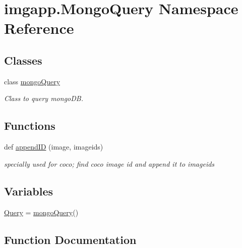 \hypertarget{namespaceimgapp_1_1MongoQuery}{}\section{imgapp.\+Mongo\+Query Namespace Reference}
\label{namespaceimgapp_1_1MongoQuery}
\subsection*{Classes}
\begin{DoxyCompactItemize}
\item 
class \hyperlink{classimgapp_1_1MongoQuery_1_1mongoQuery}{mongo\+Query}
\begin{DoxyCompactList}\small\item\em Class to query mongo\+DB. \end{DoxyCompactList}\end{DoxyCompactItemize}
\subsection*{Functions}
\begin{DoxyCompactItemize}
\item 
def \hyperlink{namespaceimgapp_1_1MongoQuery_aa2f709bf0b0e267cfb513e326bbc6e4d}{append\+ID} (image, imageids)
\begin{DoxyCompactList}\small\item\em specially used for coco; find coco image id and append it to imageids \end{DoxyCompactList}\end{DoxyCompactItemize}
\subsection*{Variables}
\begin{DoxyCompactItemize}
\item 
\hyperlink{namespaceimgapp_1_1MongoQuery_a3c845d9e355454c43db2eca20b9058bb}{Query} = \hyperlink{classimgapp_1_1MongoQuery_1_1mongoQuery}{mongo\+Query}()
\end{DoxyCompactItemize}


\subsection{Function Documentation}
\mbox{\label{namespaceimgapp_1_1MongoQuery_aa2f709bf0b0e267cfb513e326bbc6e4d}} 

